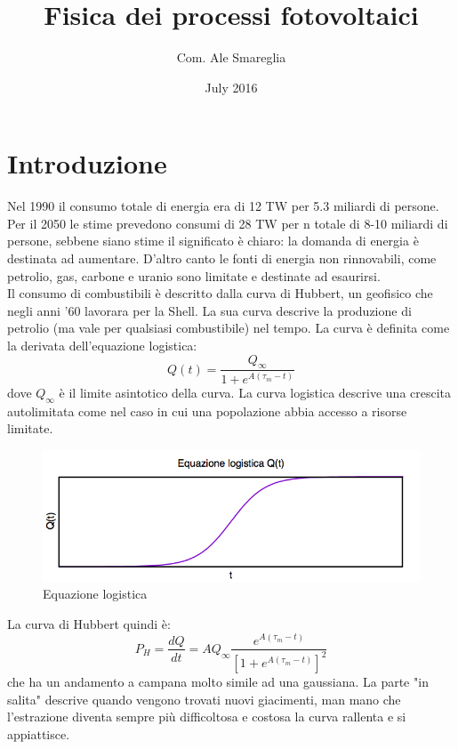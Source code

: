 \documentclass{article}
\title{Fisica dei processi fotovoltaici}
\author{Com. Ale Smareglia}
\date{July 2016}
\numberwithin{figure}{section}
\numberwithin{equation}{section}
\begin{document}
\maketitle

\section{Introduzione}
Nel 1990 il consumo totale di energia era di 12 TW per 5.3 miliardi di persone. Per il 2050 le stime prevedono consumi di 28 TW per n totale di 8-10 miliardi di persone, sebbene siano stime il significato è chiaro: la domanda di energia è destinata ad aumentare. D'altro canto le fonti di energia non rinnovabili, come petrolio, gas, carbone e uranio sono limitate e destinate ad esaurirsi.\\
Il consumo di combustibili è descritto dalla curva di Hubbert, un geofisico che negli anni '60 lavorara per la Shell. La sua curva descrive la produzione di petrolio (ma vale per qualsiasi combustibile) nel tempo. La curva è definita come la derivata dell'equazione logistica: 
\begin{equation}
   Q(t)=\frac{Q_{\infty}}{1+e^{A(\tau_m-t)}} 
\end{equation}
dove $Q_\infty$ è il limite asintotico della curva. La curva logistica descrive una crescita autolimitata come nel caso in cui una popolazione abbia accesso a risorse limitate.

\begin{figure}[h!]
    \centering
    \includegraphics{logistica.png}
    \caption{Equazione logistica}
    \label{fig:logistica}
\end{figure}
La curva di Hubbert quindi è:
\begin{equation}
P_H = \frac{dQ}{dt} = AQ_\infty\frac{e^{A(\tau_m-t)}}{[1+e^{A(\tau_m-t)}]^2}
\end{equation}
che ha un andamento a campana molto simile ad una gaussiana. La parte "in salita" descrive quando vengono trovati nuovi giacimenti, man mano che l'estrazione diventa sempre più difficoltosa e costosa la curva rallenta e si appiattisce.
\end{document}
